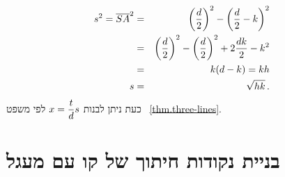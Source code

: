 \begin{eqnarray*}
s^2=\overline{SA}^2 &=& \left(\displaystyle\frac{d}{2}\right)^2 - \left(\displaystyle\frac{d}{2}-k\right)^2\\
&=& \left(\displaystyle\frac{d}{2}\right)^2 - \left(\displaystyle\frac{d}{2}\right)^2 + 2\displaystyle\frac{dk}{2} - k^2\\
&=& k(d-k)=kh\\
s&=&\sqrt{hk}\,.
\end{eqnarray*}
כעת ניתן לבנות
$x=\displaystyle\frac{t}{d}s$
לפי משפט~%
\ref{thm.three-lines}.






\section{%
בניית נקודות חיתוך של קו עם מעגל%
}\label{s.line-circle-straight}


